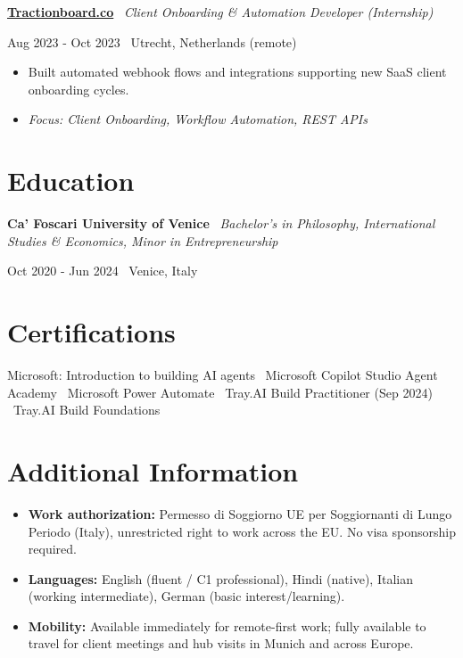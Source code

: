 \documentclass[a4paper,10pt]{article}
\newcommand{\role}[4]{%
  \vspace{2pt}\noindent
  \begin{minipage}[t]{0.70\textwidth}\raggedright\textbf{#1} \textbullet\ \textit{#3}\end{minipage}%
  \hfill
  \begin{minipage}[t]{0.28\textwidth}\raggedleft\footnotesize\color{gray}#2 \textbullet\ #4\end{minipage}%
  \vspace{1pt}%
}
\begin{document}
\role{\href{https://tractionboard.co}{Tractionboard.co}}{Aug 2023 - Oct 2023}{Client Onboarding \& Automation Developer (Internship)}{Utrecht, Netherlands (remote)}
\begin{itemize}
  \item Built automated webhook flows and integrations supporting new SaaS client onboarding cycles.
  \item \textit{Focus: Client Onboarding, Workflow Automation, REST APIs}
\end{itemize}

\section{Education}
\role{Ca' Foscari University of Venice}{Oct 2020 - Jun 2024}{Bachelor's in Philosophy, International Studies \& Economics, Minor in Entrepreneurship}{Venice, Italy}

\section{Certifications}
Microsoft: Introduction to building AI agents \textbullet\ Microsoft Copilot Studio Agent Academy \textbullet\ Microsoft Power Automate \textbullet\ Tray.AI Build Practitioner (Sep 2024) \textbullet\ Tray.AI Build Foundations

\section{Additional Information}
\begin{itemize}
  \item \textbf{Work authorization:} Permesso di Soggiorno UE per Soggiornanti di Lungo Periodo (Italy), unrestricted right to work across the EU. No visa sponsorship required.
  \item \textbf{Languages:} English (fluent / C1 professional), Hindi (native), Italian (working intermediate), German (basic interest/learning).
  \item \textbf{Mobility:} Available immediately for remote-first work; fully available to travel for client meetings and hub visits in Munich and across Europe.
\end{itemize}

\end{document}
